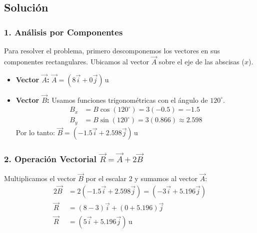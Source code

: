 \documentclass[12pt, a4paper]{article}
\begin{document}
\begin{center}
\end{center}

\subsection*{Solución}

\subsubsection*{1. Análisis por Componentes}
Para resolver el problema, primero descomponemos los vectores en sus componentes rectangulares. Ubicamos al vector $\vec{A}$ sobre el eje de las abscisas ($x$).

\begin{itemize}
    \item \textbf{Vector $\vec{A}$:} $\vec{A} = (8\vec{i} + 0\vec{j}) \, \text{u}$
    \item \textbf{Vector $\vec{B}$:} Usamos funciones trigonométricas con el ángulo de $120^\circ$.
    \begin{align*}
        B_x &= B \cos(120^\circ) = 3(-0.5) = -1.5 \\
        B_y &= B \sin(120^\circ) = 3(0.866) \approx 2.598
    \end{align*}
    Por lo tanto: $\vec{B} = (-1.5\vec{i} + 2.598\vec{j}) \, \text{u}$
\end{itemize}

\subsubsection*{2. Operación Vectorial $\vec{R} = \vec{A} + 2\vec{B}$}
Multiplicamos el vector $\vec{B}$ por el escalar 2 y sumamos al vector $\vec{A}$:
\begin{align*}
    2\vec{B} &= 2(-1.5\vec{i} + 2.598\vec{j}) = (-3\vec{i} + 5.196\vec{j}) \\
    \vec{R} &= (8 - 3)\vec{i} + (0 + 5.196)\vec{j} \\
    \vec{R} &= (5\vec{i} + 5.196\vec{j}) \, \text{u}
\end{align*}
\end{document}
